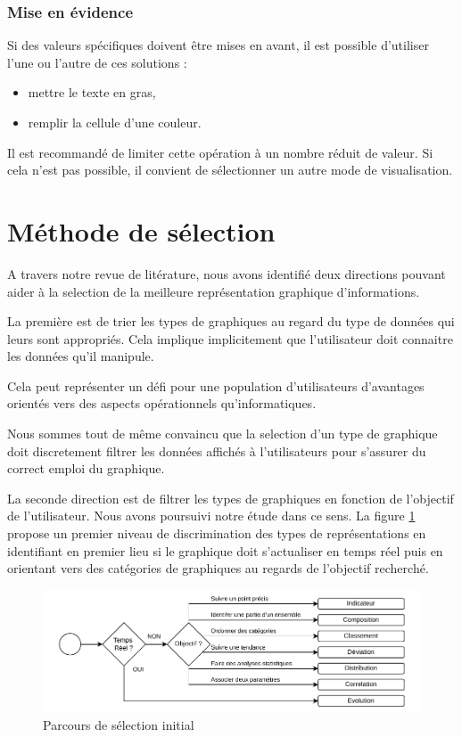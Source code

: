 \documentclass[a4paper,12pt]{article}
\begin{document}
\begin{multicols}{2}
\subsubsection*{Mise en évidence}
\label{sec:org56afb46}
Si des valeurs spécifiques doivent être mises en avant, il est possible d'utiliser l'une ou l'autre de ces solutions :
\begin{itemize}
\item mettre le texte en gras,
\item remplir la cellule d'une couleur.
\end{itemize}
Il est recommandé de limiter cette opération à un nombre réduit de valeur. Si cela n'est pas possible, il convient de sélectionner un autre mode de visualisation.
\section*{Méthode de sélection}
\label{sec:org4b98e7e}
A travers notre revue de litérature, nous avons identifié deux directions pouvant aider à la selection de la meilleure représentation graphique d'informations.

La première est de trier les types de graphiques au regard du type de données qui leurs sont appropriés. Cela implique implicitement que l'utilisateur doit connaitre les données qu'il manipule.

Cela peut représenter un défi pour une population d'utilisateurs d'avantages orientés vers des aspects opérationnels qu'informatiques.

Nous sommes tout de même convaincu que la selection d'un type de graphique doit discretement filtrer les données affichés à l'utilisateurs pour s'assurer du correct emploi du graphique.

La seconde direction est de filtrer les types de graphiques en fonction de l'objectif de l'utilisateur. Nous avons poursuivi notre étude dans ce sens. La figure \ref{fig:select-filter} propose un premier niveau de discrimination des types de représentations en identifiant en premier lieu si le graphique doit s'actualiser en temps réel puis en orientant vers des catégories de graphiques au regards de l'objectif recherché.

\begin{figure}
\centering
\includegraphics[width=.9\linewidth]{./img/select-filter.pdf}
\caption{\label{fig:select-filter}Parcours de sélection initial}
\end{figure}


\end{multicols}
\end{document}
